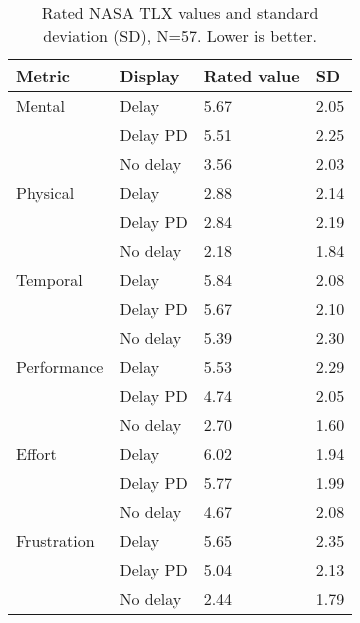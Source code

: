 \begin{table}[]
\small
\centering
\caption{Rated NASA TLX values and standard deviation (SD), N=57. Lower is better.}
\label{tlx_values}
\begin{tabularx}{\textwidth}{@{}XXXX@{}}
\toprule
Metric      & Display  & Rated value & SD \\ \midrule
Mental      & Delay    & 5.67        & 2.05               \\
            & Delay PD & 5.51        & 2.25               \\
            & No delay & 3.56        & 2.03               \\\addlinespace
Physical    & Delay    & 2.88        & 2.14               \\
            & Delay PD & 2.84        & 2.19               \\
            & No delay & 2.18        & 1.84               \\\addlinespace
Temporal    & Delay    & 5.84        & 2.08               \\
            & Delay PD & 5.67        & 2.10               \\
            & No delay & 5.39        & 2.30               \\\addlinespace
Performance & Delay    & 5.53        & 2.29               \\
            & Delay PD & 4.74        & 2.05               \\
            & No delay & 2.70        & 1.60               \\\addlinespace
Effort      & Delay    & 6.02        & 1.94               \\
            & Delay PD & 5.77        & 1.99               \\
            & No delay & 4.67        & 2.08               \\\addlinespace
Frustration & Delay    & 5.65        & 2.35               \\
            & Delay PD & 5.04        & 2.13               \\
            & No delay & 2.44        & 1.79               \\ \bottomrule
\end{tabularx}
\end{table}